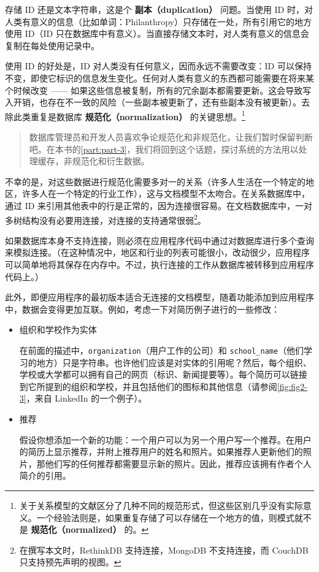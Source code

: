 存储 ID 还是文本字符串，这是个 \textbf{副本（duplication）} 问题。当使用 ID 时，对人类有意义的信息（比如单词：Philanthropy）只存储在一处，所有引用它的地方使用 ID（ID 只在数据库中有意义）。当直接存储文本时，对人类有意义的信息会复制在每处使用记录中。

使用 ID 的好处是，ID 对人类没有任何意义，因而永远不需要改变：ID 可以保持不变，即使它标识的信息发生变化。任何对人类有意义的东西都可能需要在将来某个时候改变 —— 如果这些信息被复制，所有的冗余副本都需要更新。这会导致写入开销，也存在不一致的风险（一些副本被更新了，还有些副本没有被更新）。去除此类重复是数据库 \textbf{规范化（normalization）} 的关键思想。\footnote{关于关系模型的文献区分了几种不同的规范形式，但这些区别几乎没有实际意义。一个经验法则是，如果重复存储了可以存储在一个地方的值，则模式就不是 \textbf{规范化（normalized）} 的。}

\begin{quote}
    数据库管理员和开发人员喜欢争论规范化和非规范化，让我们暂时保留判断吧。在本书的\autoref{part:part-3}，我们将回到这个话题，探讨系统的方法用以处理缓存，非规范化和衍生数据。
\end{quote}

不幸的是，对这些数据进行规范化需要多对一的关系（许多人生活在一个特定的地区，许多人在一个特定的行业工作），这与文档模型不太吻合。在关系数据库中，通过 ID 来引用其他表中的行是正常的，因为连接很容易。在文档数据库中，一对多树结构没有必要用连接，对连接的支持通常很弱\footnote{在撰写本文时，RethinkDB 支持连接，MongoDB 不支持连接，而 CouchDB 只支持预先声明的视图。}。

如果数据库本身不支持连接，则必须在应用程序代码中通过对数据库进行多个查询来模拟连接。（在这种情况中，地区和行业的列表可能很小，改动很少，应用程序可以简单地将其保存在内存中。不过，执行连接的工作从数据库被转移到应用程序代码上。）

此外，即便应用程序的最初版本适合无连接的文档模型，随着功能添加到应用程序中，数据会变得更加互联。例如，考虑一下对简历例子进行的一些修改：

\begin{itemize}
    \item 组织和学校作为实体

          在前面的描述中，\texttt{organization}（用户工作的公司）和 \texttt{school\_name}（他们学习的地方）只是字符串。也许他们应该是对实体的引用呢？然后，每个组织、学校或大学都可以拥有自己的网页（标识、新闻提要等）。每个简历可以链接到它所提到的组织和学校，并且包括他们的图标和其他信息（请参阅\autoref{fig:fig2-3}，来自 LinkedIn 的一个例子）。

    \item 推荐

          假设你想添加一个新的功能：一个用户可以为另一个用户写一个推荐。在用户的简历上显示推荐，并附上推荐用户的姓名和照片。如果推荐人更新他们的照片，那他们写的任何推荐都需要显示新的照片。因此，推荐应该拥有作者个人简介的引用。
\end{itemize}

